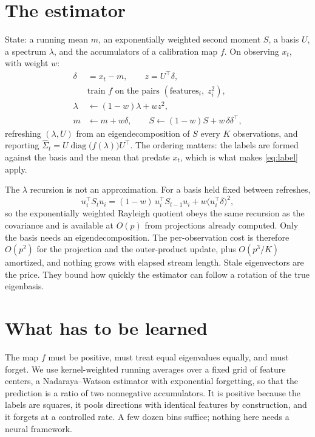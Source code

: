 \documentclass[11pt]{article}
\begin{document}
\section{The estimator}

State: a running mean $m$, an exponentially weighted second moment $S$, a basis $U$, a spectrum
$\lambda$, and the accumulators of a calibration map $f$. On observing $x_t$, with weight $w$:
\begin{align*}
  \delta &= x_t - m, \qquad z = U^\top \delta, \\
  &\text{train } f \text{ on the pairs } (\text{features}_i,\; z_i^2), \\
  \lambda &\leftarrow (1-w)\lambda + w z^2, \\
  m &\leftarrow m + w\delta, \qquad S \leftarrow (1-w) S + w\, \delta \delta^\top,
\end{align*}
refreshing $(\lambda, U)$ from an eigendecomposition of $S$ every $K$ observations, and reporting
$\hat\Sigma_t = U \operatorname{diag}\bigl(f(\lambda)\bigr) U^\top$. The ordering matters: the labels
are formed against the basis and the mean that predate $x_t$, which is what makes \eqref{eq:label}
apply.

The $\lambda$ recursion is not an approximation. For a basis held fixed between refreshes,
\[
  u_i^\top S_t u_i = (1-w)\, u_i^\top S_{t-1} u_i + w \bigl(u_i^\top \delta\bigr)^2 ,
\]
so the exponentially weighted Rayleigh quotient obeys the same recursion as the covariance and is
available at $O(p)$ from projections already computed. Only the basis needs an eigendecomposition.
The per-observation cost is therefore $O(p^2)$ for the projection and the outer-product
update, plus $O(p^3/K)$ amortized, and nothing grows with elapsed stream length. Stale eigenvectors
are the price. They bound how quickly the estimator can follow a rotation of the true eigenbasis.

\section{What has to be learned}

The map $f$ must be positive, must treat equal eigenvalues equally, and must forget. We use
kernel-weighted running averages over a fixed grid of feature centers, a Nadaraya--Watson estimator
with exponential forgetting, so that the prediction is a ratio of two nonnegative accumulators. It
is positive because the labels are squares, it pools directions with identical features by
construction, and it forgets at a controlled rate. A few dozen bins suffice; nothing here needs a
neural framework.
\end{document}
